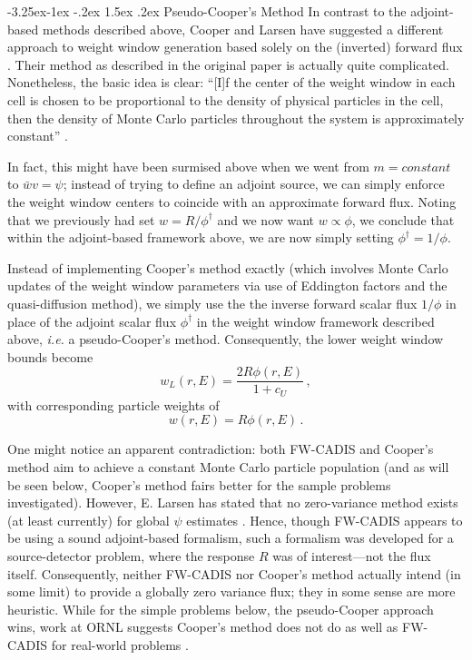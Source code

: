 \documentclass[letter,11pt]{article}
\makeatletter
\renewcommand\subsection{\@startsection{subsection}{2}{\z@}%
                                {-3.25ex\@plus -1ex \@minus -.2ex}%
                                {1.5ex \@plus .2ex}%
                                {\normalfont\itshape\bf}}
\newcommand{\ie}{{\it i.e. }}
\makeatother
\begin{document}
\subsection{Pseudo-Cooper's Method}
In contrast to the adjoint-based methods described above, Cooper and Larsen have suggested a different approach to weight window generation based solely on the (inverted) forward flux \cite{cooper2001aww}.  Their method as described in the original paper is actually quite complicated. Nonetheless, the basic idea is clear: ``[I]f the center of the weight window in each cell is chosen to be proportional to the density of physical particles in the cell, then the density of Monte Carlo particles throughout the system is approximately constant'' \cite{cooper2001aww}.  

In fact, this might have been surmised above when we went from $m = constant$ to $\bar{w}v=\psi$; instead of trying to define an adjoint source, we can simply enforce the weight window centers to coincide with an approximate forward flux.   Noting that we previously had set $w = R/\phi^\dag$ and we now want $w \propto \phi$, we conclude that within the adjoint-based framework above, we are now simply setting $\phi^\dag = 1/\phi$.

Instead of implementing Cooper's method exactly (which involves Monte Carlo updates of the weight window parameters via use of Eddington factors and the quasi-diffusion method), we simply use the the inverse forward scalar flux $1/\phi$ in place of the adjoint scalar flux $\phi^\dag$ in the weight window framework described above, \ie a pseudo-Cooper's method.  Consequently, the lower weight window bounds become
\begin{equation}
 w_L(r,E) = \frac{2R\phi(r,E)}{1+c_U} \, ,
\end{equation}
with corresponding particle weights of
\begin{equation}
 w(r,E) = R\phi(r,E) \, .
\end{equation}

One might notice an apparent contradiction: both FW-CADIS and Cooper's method aim to achieve a constant Monte Carlo particle population (and as will be seen below, Cooper's method fairs better for the sample problems investigated).  However, E. Larsen has stated that no zero-variance method exists (at least currently) for global $\psi$ estimates \cite{larsen2007hmc}.  Hence, though FW-CADIS appears to be using a sound adjoint-based formalism, such a formalism was developed for a source-detector problem, where the response $R$ was of interest---not the flux itself.  Consequently, neither FW-CADIS nor Cooper's method actually intend (in some limit) to provide a globally zero variance flux; they in some sense are more heuristic.  While for the simple problems below, the pseudo-Cooper approach wins, work at ORNL suggests Cooper's method does not do as well as FW-CADIS for real-world problems \cite{wagner2009fwc}.
\end{document}
